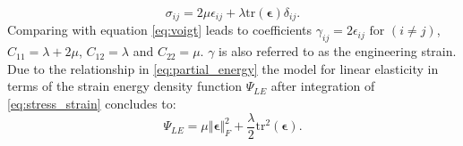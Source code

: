 \documentclass[m,times]{cgMA}
\begin{document}
\begin{equation} \label{eq:stress_strain}
  \sigma_{ij} = 2\mu \epsilon_{ij} + \lambda \text{tr}(\boldsymbol{\epsilon}) \delta_{ij}.
\end{equation}
Comparing with equation \ref{eq:voigt} leads to coefficients $\gamma_{ij} = 2\epsilon_{ij} \text{ for } (i \neq j)$, $C_{11} = \lambda +2 \mu$, $C_{12} = \lambda$ and $C_{22} = \mu$. $\gamma$ is also referred to as the engineering strain. Due to the relationship in \ref{eq:partial_energy} the model for linear elasticity in terms of the strain energy density function $\Psi_{LE}$ after integration of \ref{eq:stress_strain} concludes to:
\begin{equation}\label{eq:linear_elas}
  \Psi_{LE} = \mu \Vert \boldsymbol{\epsilon} \Vert^2_F + \frac{\lambda}{2} \text{tr}^2(\boldsymbol{\epsilon}).
\end{equation}
\cite{MIT:LINEAR_ELASTICITY}
\end{document}

